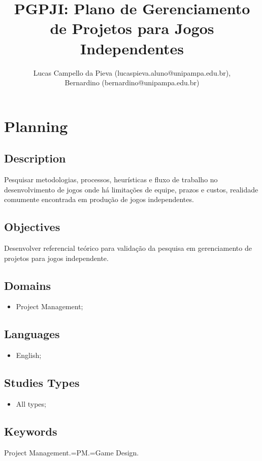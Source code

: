 \documentclass [11pt]{article}
\title{PGPJI: Plano de Gerenciamento de Projetos para Jogos Independentes}
\author{Lucas Campello da Pieva (lucaspieva.aluno@unipampa.edu.br),\\ Bernardino (bernardino@unipampa.edu.br)}
\begin{document}
\maketitle

\begin{abstract}
\end{abstract}

\section{Planning}

\subsection{Description}
Pesquisar metodologias, processos, heurísticas e fluxo de trabalho no desenvolvimento de jogos onde há limitações de equipe, prazos e  custos, realidade comumente encontrada em produção de jogos independentes.

\subsection{Objectives}
Desenvolver referencial teórico para validação da pesquisa em gerenciamento de projetos para jogos independente.

\subsection{Domains}
\begin{itemize}
	\item Project Management;
\end{itemize}

\subsection{Languages}
\begin{itemize}
	\item English;
\end{itemize}

\subsection{Studies Types}
\begin{itemize}
	\item All types;
\end{itemize}

\subsection{Keywords}
Project Management.=PM.=Game Design.
\end{document}
